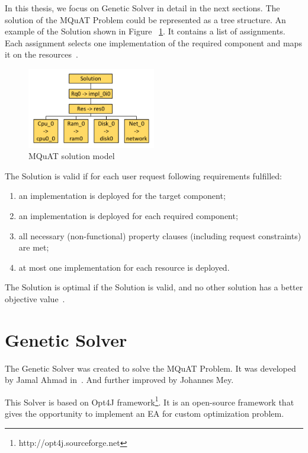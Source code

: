 In this thesis, we focus on Genetic Solver in detail in the next sections. The solution of the MQuAT Problem could be represented as a tree structure. An example of the Solution shown in Figure ~\ref{fig:SolutionModel}. It contains a list of assignments. Each assignment selects one implementation of the required component and maps it on the resources~\cite{gotz18}.


\begin{figure}
	\centering
	\includegraphics[width=0.5\textwidth]{images/MQuATSolutionModel.pdf}
	\caption[MQuAT solution model]{MQuAT solution model}
	\label{fig:SolutionModel}
\end{figure}


The Solution is valid if for each user request following requirements fulfilled:
\begin{enumerate}
	\item an implementation is deployed for the target component;
	\item an implementation is deployed for each required component;
	\item all necessary (non-functional) property clauses (including request constraints) are met;
	\item at most one implementation for each resource is deployed.
\end{enumerate}

The Solution is optimal if the Solution is valid, and no other solution has a better objective value~\cite{gotz18}.



\section{Genetic Solver}\label{sec:GeneticSolver}
The Genetic Solver was created to solve the MQuAT Problem. It was developed by Jamal Ahmad in~\cite{ahmad18}. And further improved by Johannes Mey.

This Solver is based on Opt4J framework\footnote{http://opt4j.sourceforge.net}. It is an open-source framework that gives the opportunity to implement an EA for custom optimization problem.

